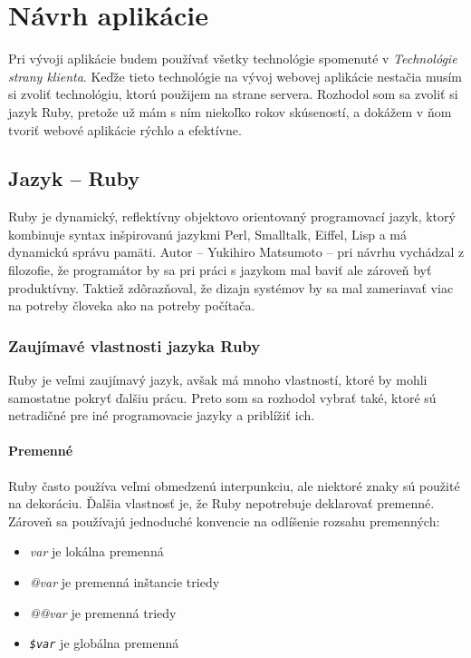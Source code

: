 \chapter{Návrh aplikácie}

Pri vývoji aplikácie budem používať všetky technológie spomenuté v \emph{Technológie strany klienta}. Keďže tieto technológie na vývoj webovej aplikácie nestačia musím si zvoliť technológiu, ktorú použijem na strane servera. Rozhodol som sa zvoliť si jazyk Ruby, pretože už mám s ním niekoľko rokov skúseností, a dokážem v ňom tvoriť webové aplikácie rýchlo a efektívne.

\section{Jazyk -- Ruby}

Ruby je dynamický, reflektívny objektovo orientovaný programovací jazyk, ktorý kombinuje syntax inšpirovanú jazykmi Perl, Smalltalk, Eiffel, Lisp a má dynamickú správu pamäti. Autor -- Yukihiro Matsumoto -- pri návrhu vychádzal z filozofie, že programátor by sa pri práci s jazykom mal baviť ale zároveň byť produktívny. Taktiež zdôrazňoval, že dizajn systémov by sa mal zameriavať viac na potreby človeka ako na potreby počítača. \citep{matsumoto2002ruby}

\subsection{Zaujímavé vlastnosti jazyka Ruby}

Ruby je veľmi zaujímavý jazyk, avšak má mnoho vlastností, ktoré by mohli samostatne pokryť ďalšiu prácu. Preto som sa rozhodol vybrať také, ktoré sú netradičné pre iné programovacie jazyky a priblížiť ich.

\clearpage
\subsubsection{Premenné}

Ruby často používa veľmi obmedzenú interpunkciu, ale niektoré znaky sú použité na dekoráciu. Ďalšia vlastnosť je, že Ruby nepotrebuje deklarovať premenné. Zároveň sa používajú jednoduché konvencie na odlíšenie rozsahu premenných:

\begin{itemize}
    \item \emph{var} je lokálna premenná
    \item \emph{@var} je premenná inštancie triedy
    \item \emph{@@var} je premenná triedy
    \item \emph{\texttt{\$var}} je globálna premenná
\end{itemize}

